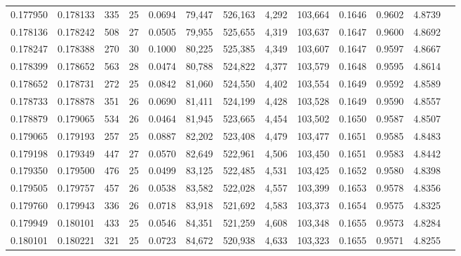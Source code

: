 \begin{tabular}{rrrrrrrrrrrrr}
0.177950 & 0.178133 &   335 &  25 &                                     0.0694 &  79,447 & 526,163 &   4,292 & 103,664 & 0.1646 & 0.9602 & 4.8739 \\
0.178136 & 0.178242 &   508 &  27 &                                     0.0505 &  79,955 & 525,655 &   4,319 & 103,637 & 0.1647 & 0.9600 & 4.8692 \\
0.178247 & 0.178388 &   270 &  30 &                                     0.1000 &  80,225 & 525,385 &   4,349 & 103,607 & 0.1647 & 0.9597 & 4.8667 \\
0.178399 & 0.178652 &   563 &  28 &                                     0.0474 &  80,788 & 524,822 &   4,377 & 103,579 & 0.1648 & 0.9595 & 4.8614 \\
0.178652 & 0.178731 &   272 &  25 &                                     0.0842 &  81,060 & 524,550 &   4,402 & 103,554 & 0.1649 & 0.9592 & 4.8589 \\
0.178733 & 0.178878 &   351 &  26 &                                     0.0690 &  81,411 & 524,199 &   4,428 & 103,528 & 0.1649 & 0.9590 & 4.8557 \\
0.178879 & 0.179065 &   534 &  26 &                                     0.0464 &  81,945 & 523,665 &   4,454 & 103,502 & 0.1650 & 0.9587 & 4.8507 \\
0.179065 & 0.179193 &   257 &  25 &                                     0.0887 &  82,202 & 523,408 &   4,479 & 103,477 & 0.1651 & 0.9585 & 4.8483 \\
0.179198 & 0.179349 &   447 &  27 &                                     0.0570 &  82,649 & 522,961 &   4,506 & 103,450 & 0.1651 & 0.9583 & 4.8442 \\
0.179350 & 0.179500 &   476 &  25 &                                     0.0499 &  83,125 & 522,485 &   4,531 & 103,425 & 0.1652 & 0.9580 & 4.8398 \\
0.179505 & 0.179757 &   457 &  26 &                                     0.0538 &  83,582 & 522,028 &   4,557 & 103,399 & 0.1653 & 0.9578 & 4.8356 \\
0.179760 & 0.179943 &   336 &  26 &                                     0.0718 &  83,918 & 521,692 &   4,583 & 103,373 & 0.1654 & 0.9575 & 4.8325 \\
0.179949 & 0.180101 &   433 &  25 &                                     0.0546 &  84,351 & 521,259 &   4,608 & 103,348 & 0.1655 & 0.9573 & 4.8284 \\
0.180101 & 0.180221 &   321 &  25 &                                     0.0723 &  84,672 & 520,938 &   4,633 & 103,323 & 0.1655 & 0.9571 & 4.8255 \\

\end{tabular}
